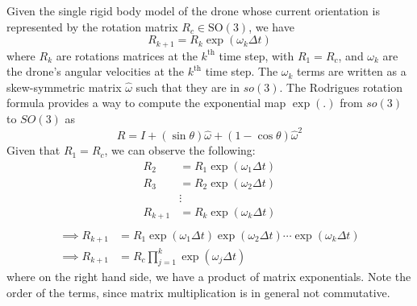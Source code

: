 Given the single rigid body model of the drone whose current orientation is represented by the rotation matrix \( R_c \in \text{SO}(3) \), we have
\begin{equation*}
    R_{k+1}
    =
    R_k \exp(\omega_k \Delta t)
\end{equation*}
where \( R_k \) are rotations matrices at the \( k^{\text{th}} \) time step, with \( R_{1} = R_c \), and \( \omega_k \) are the drone's angular velocities at the \( k^{\text{th}} \) time step.
The \( \omega_k \) terms are written as a skew-symmetric matrix \( \hat\omega \) such that they are in \( so(3) \).
The Rodrigues rotation formula provides a way to compute the exponential map \( \exp(.) \) from \(so(3)\) to \(SO(3)\) as
\[
    R = I +(\sin \theta )\hat\omega +(1-\cos \theta )\hat\omega^2
\]
Given that \( R_{1} = R_c \), we can observe the following:
\begin{align*}
    R_{2}
     & =
    R_{1} \exp(\omega_1 \Delta t)
    \\
    R_{3}
     & =
    R_{2} \exp(\omega_2 \Delta t)
    \\ &
    \vdots
    \\
    R_{k+1}
     & =
    R_{k} \exp(\omega_k \Delta t)
    \\
\end{align*}
\begin{align*}
    \implies
    R_{k+1}
     & =
    R_1 \exp(\omega_1 \Delta t) \exp(\omega_2 \Delta t) \cdots \exp(\omega_k \Delta t)
    \\
    \implies
    R_{k+1}
     & =
    R_c \prod_{j=1}^{k} \exp(\omega_j \Delta t)
\end{align*}
where on the right hand side, we have a product of matrix exponentials.
Note the order of the terms, since matrix multiplication is in general not commutative.

